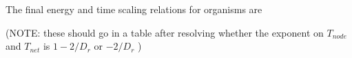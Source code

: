 \documentclass[12pt]{article}
\begin{document}
%
%


%


The final energy and time scaling relations for 
organisms are  

(NOTE: these should go in a table after resolving whether the exponent on $T_{node}$ and $T_{net}$ is $1- 2/{D_r}$ or $- 2/{D_r}$  )
\end{document}
